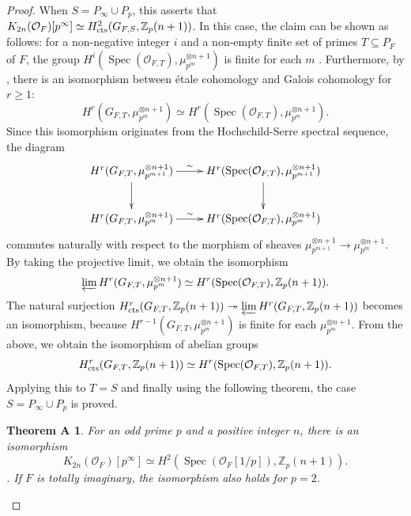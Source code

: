 \documentclass{article}
\numberwithin{equation}{section} %
\newtheorem*{themA}{Theorem A}
\begin{document}
  \begin{proof}
      

    When $S = P_\infty \cup P_p$, this asserts that $K_{2n}(\mathcal{O}_F)[p^\infty] \simeq H^2_{\rm cts}(G_{F,S}, \mathbb{Z}_p(n+1))$. In this case, the claim can be shown as follows: for a non-negative integer $i$ and a non-empty finite set of primes $T \subseteq P_F$ of $F$, the group $H^i(\operatorname{Spec}(\mathcal{O}_{F,T}), \mu_{p^m}^{\otimes n+1})$ is finite for each $m$ \cite[Proposition 2.13]{Milne}. Furthermore, by \cite[Proposition 2.9]{Milne}, there is an isomorphism between étale cohomology and Galois cohomology for $r \geq 1$:
\[
  H^r(G_{F,T}, \mu_{p^m}^{\otimes n+1}) \simeq H^r(\operatorname{Spec}(\mathcal{O}_{F,T}), \mu_{p^m}^{\otimes n +1}).
\]
Since this isomorphism originates from the Hochschild-Serre spectral sequence, the diagram
\[
  \xymatrix{
    H^r(G_{F,T}, \mu_{p^{m+1}}^{\otimes n+1}) \ar[r]^-{\sim} \ar[d] & H^r(\operatorname{Spec}(\mathcal{O}_{F,T}), \mu_{p^{m+1}}^{\otimes n +1}) \ar[d] \\
    H^r(G_{F,T}, \mu_{p^m}^{\otimes n+1}) \ar[r]^-{\sim} & H^r(\operatorname{Spec}(\mathcal{O}_{F,T}), \mu_{p^m}^{\otimes n +1})
  }
\]
commutes naturally with respect to the morphism of sheaves $\mu_{p^{m+1}}^{\otimes n+1} \to \mu_{p^m}^{\otimes n+1}$. By taking the projective limit, we obtain the isomorphism
\[
  \varprojlim H^r(G_{F,T}, \mu_{p^m}^{\otimes n+1}) \simeq H^r(\operatorname{Spec}(\mathcal{O}_{F,T}), \mathbb{Z}_p(n+1)).
\]
The natural surjection $H^r_{\rm cts}(G_{F,T}, \mathbb{Z}_p(n+1)) \twoheadrightarrow \varprojlim H^r(G_{F,T}, \mathbb{Z}_p (n+1))$ becomes an isomorphism, because $H^{r-1}(G_{F,T} , \mu_{p^m}^{\otimes n+1})$ is finite for each $\mu_{p^m}^{\otimes n+1}$. From the above, we obtain the isomorphism of abelian groups
\[
  H^r_{\rm cts}(G_{F,T}, \mathbb{Z}_p(n+1)) \simeq H^r(\operatorname{Spec}(\mathcal{O}_{F,T}), \mathbb{Z}_p(n+1)).
\]
Applying this to $T = S$ and finally using the following theorem, the case $S = P_\infty \cup P_p$ is proved.

\begin{themA}
  For an odd prime $p$ and a positive integer $n$, there is an isomorphism
  \[
    K_{2n}(\mathcal{O}_{F})[p^\infty] \simeq H^2(\operatorname{Spec}(\mathcal{O}_{F}[1/p]), \mathbb{Z}_p(n+1)).
  \]
  \cite[Theorem 70]{Weibel3}. If $F$ is totally imaginary, the isomorphism also holds for $p=2$. \cite[Theorem 73]{Weibel3} 
\end{themA}


\end{proof}
\end{document}
